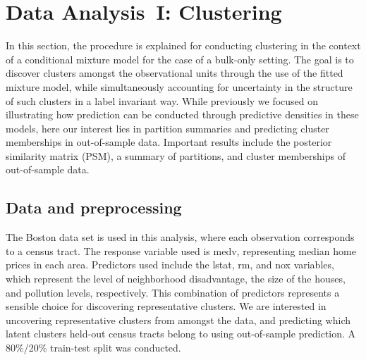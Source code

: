 \documentclass[article]{jss}\usepackage[]{graphicx}\usepackage[]{xcolor}
\begin{document}
\section{Data Analysis~I: Clustering}
\label{sec:app-clustering}

In this section, the procedure is explained for conducting clustering in the context of a conditional mixture model for the case of a bulk-only setting. The goal is to discover clusters amongst the observational units through the use of the fitted mixture model, while simultaneously accounting for uncertainty in the structure of such clusters in a label invariant way. While previously we focused on illustrating how prediction can be conducted through predictive densities in these models, here our interest lies in partition summaries and predicting cluster memberships in out-of-sample data. Important results include the posterior similarity matrix (PSM), a summary of partitions, and cluster memberships of out-of-sample data.

\subsection{Data and preprocessing}

The Boston data set is used in this analysis, where each observation corresponds to a census tract. The response variable used is medv, representing median home prices in each area. Predictors used include the lstat, rm, and nox variables, which represent the level of neighborhood disadvantage, the size of the houses, and pollution levels, respectively. This combination of predictors represents a sensible choice for discovering representative clusters. We are interested in uncovering representative clusters from amongst the data, and predicting which latent clusters held-out census tracts belong to using out-of-sample prediction. A 80\%/20\% train-test split was conducted.
\end{document}
